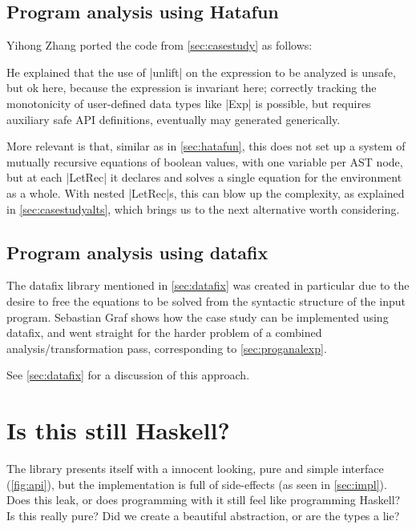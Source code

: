 \documentclass[manuscript,screen,acmsmall,nonacm]{acmart}
\newif\ifpure
\begin{document}
\subsection{Program analysis using Hatafun}\label{sec:hatafun-proganal}

Yihong Zhang ported the code from \cref{sec:casestudy} as follows:


He explained that the use of |unlift| on the expression to be analyzed is unsafe, but ok here, because the expression is invariant here; correctly tracking the monotonicity of user-defined data types like |Exp| is possible, but requires auxiliary safe API definitions, eventually may generated generically.

More relevant is that, similar as in \cref{sec:hatafun}, this does not set up a system of mutually recursive equations of boolean values, with one variable per AST node, but at each |LetRec| it declares and solves a single equation for the environment as a whole. With nested |LetRec|s, this can blow up the complexity, as explained in \cref{sec:casestudyalts}, which brings us to the next alternative worth considering.


\subsection{Program analysis using datafix}\label{sec:datafix-code}

The datafix library mentioned in \cref{sec:datafix} was created in particular due to the desire to free the equations to be solved from the syntactic structure of the input program. Sebastian Graf shows how the case study can be implemented using datafix, and went straight for the harder problem of a combined analysis/transformation pass, corresponding to \cref{sec:proganalexp}.


See \cref{sec:datafix} for a discussion of this approach.


\ifpure
\section{Is this still Haskell?}\label{sec:pure}

The library presents itself with a innocent looking, pure and simple interface (\cref{fig:api}), but the implementation is full of side-effects (as seen in \cref{sec:impl}).
Does this leak, or does programming with it still feel like programming Haskell?
Is this really pure? Did we create a beautiful abstraction, or are the types a lie?
\end{document}
